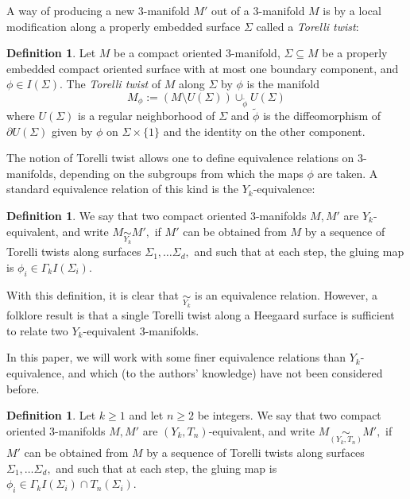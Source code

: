 \documentclass[12pt]{amsart}
\theoremstyle{definition}
\newtheorem{dfn}[thm]{Definition}
\begin{document}
A way of producing a new $3$-manifold $M'$ out of a $3$-manifold $M$ is by a local modification along a properly embedded surface $\Sigma$ called a \emph{Torelli twist}:

\begin{dfn}\label{def:TorelliTwist}
	Let $M$ be a compact oriented $3$-manifold, $\Sigma\subseteq M$ be a properly embedded compact oriented surface with at most one boundary component, and $\phi\in I(\Sigma)$. The \emph{Torelli twist} of $M$ along $\Sigma$ by $\phi$ is the manifold 
	\[M_\phi:= \left(M\setminus U(\Sigma)\right)\cup_{\widetilde{\phi}} U(\Sigma)\]
	where $U(\Sigma)$ is a regular neighborhood of $\Sigma$ and $\widetilde{\phi}$ is the diffeomorphism of $\partial U(\Sigma)$ given by $\phi$ on $\Sigma\times \{1\}$ and the identity on the other component.
\end{dfn}

The notion of Torelli twist allows one to define equivalence relations on $3$-manifolds, depending on the subgroups from which the maps $\phi$ are taken. A standard equivalence relation of this kind is the $Y_k$-equivalence:

\begin{dfn}\label{def:YkEquiv}
We say that two compact oriented $3$-manifolds $M,M'$ are $Y_k$-equivalent, and write $M\underset{Y_k}{\sim}M',$ if $M'$ can be obtained from $M$ by a sequence of Torelli twists along surfaces $\Sigma_1,\ldots \Sigma_d,$ and such that at each step, the gluing map is $\phi_i \in \Gamma_k I(\Sigma_i).$
\end{dfn}
With this definition, it is clear that $\underset{Y_k}{\sim}$ is an equivalence relation. However, a folklore result is that a single Torelli twist along a Heegaard surface is sufficient to relate two $Y_k$-equivalent $3$-manifolds. 



In this paper, we will work with some finer equivalence relations than $Y_k$-equivalence, and which (to the authors' knowledge) have not been considered before.

\begin{dfn}\label{def:YkTnEquiv}
	Let $k\geq 1$ and let $n\geq 2$ be integers.
	We say that two compact oriented $3$-manifolds $M,M'$ are $(Y_k,T_n)$-equivalent, and write $M\underset{(Y_k,T_n)}{\sim}M',$ if $M'$ can be obtained from $M$ by a sequence of Torelli twists along surfaces $\Sigma_1,\ldots \Sigma_d,$ and such that at each step, the gluing map is $\phi_i \in \Gamma_k I(\Sigma_i)\cap T_n(\Sigma_i).$
\end{dfn}
\end{document}
